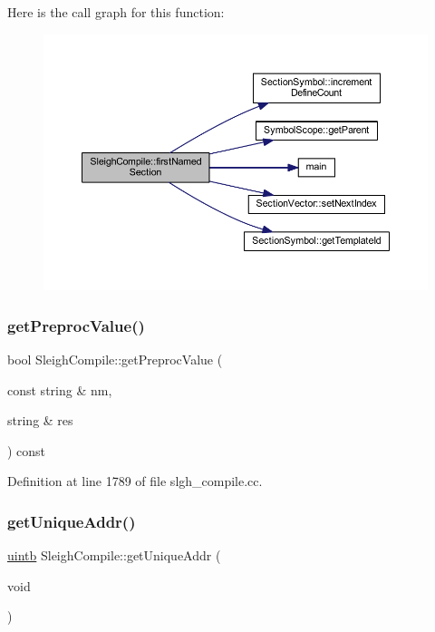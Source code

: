 Here is the call graph for this function\+:
\nopagebreak
\begin{figure}[H]
\begin{center}
\leavevmode
\includegraphics[width=350pt]{class_sleigh_compile_a5b1db8a0c6f01322e117577d323c75cd_cgraph}
\end{center}
\end{figure}
\mbox{\label{class_sleigh_compile_a009d448b5035a45a520b85074b0d545a}} 
\subsubsection{\texorpdfstring{getPreprocValue()}{getPreprocValue()}}
{\footnotesize\ttfamily bool Sleigh\+Compile\+::get\+Preproc\+Value (\begin{DoxyParamCaption}\item[{const string \&}]{nm,  }\item[{string \&}]{res }\end{DoxyParamCaption}) const}



Definition at line 1789 of file slgh\+\_\+compile.\+cc.

\mbox{\label{class_sleigh_compile_a32f70f8b08cba76013faffe61966a080}} 
\subsubsection{\texorpdfstring{getUniqueAddr()}{getUniqueAddr()}}
{\footnotesize\ttfamily \mbox{\hyperlink{types_8h_a2db313c5d32a12b01d26ac9b3bca178f}{uintb}} Sleigh\+Compile\+::get\+Unique\+Addr (\begin{DoxyParamCaption}\item[{void}]{ }\end{DoxyParamCaption})}



